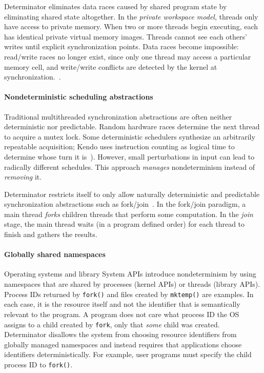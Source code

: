 Determinator eliminates data races caused by shared program state by eliminating
shared state altogether. In the \emph{private workspace model}, threads only
have access to private memory. When two or more threads begin executing, each
has identical private virtual memory images. Threads cannot see each others'
writes until explicit synchronization points. Data races become impossible:
read/write races no longer exist, since only one thread may access a particular
memory cell, and write/write conflicts are detected by the kernel at
synchronization.~\cite{Aviram10}. 

\paragraph{Nondeterministic scheduling abstractions}
Traditional multithreaded synchronization abstractions are often neither
deterministic nor predictable. Random hardware races determine the next thread
to acquire a mutex lock. Some deterministic schedulers synthesize an arbitrarily
repeatable acquisition; Kendo uses instruction counting as logical time to
determine whose turn it is~\cite{olszewski2009kendo}). However, small
perturbations in input can lead to radically different schedules. This approach
\emph{manages} nondeterminism instead of \emph{removing} it.

Determinator restricts itself to only allow naturally deterministic and
predictable synchronization abstractions such as
fork/join~\cite{nelson1988approximate}. In the fork/join paradigm, a main thread
\emph{forks} children threads that perform some computation. In the \emph{join}
stage, the main thread waits (in a program defined order) for each thread to
finish and gathers the results.

\paragraph{Globally shared namespaces}
Operating systems and library
System APIs introduce nondeterminism by using namespaces that are shared by
processes (kernel APIs) or threads (library APIs). Process IDs returned by
{\tt fork()} and files created by {\tt mktemp()} are examples. In each case,
it is the resource itself and not the identifier that is semantically relevant
to the program. A program does not care what process ID the OS assigns to a
child created by {\tt fork}, only that \emph{some} child was created.
Determinator disallows the system from choosing resource identifiers
from globally managed namespaces and instead requires that applications
choose identifiers deterministically. For example, user programs must specify
the child process ID to {\tt fork()}.
\\

